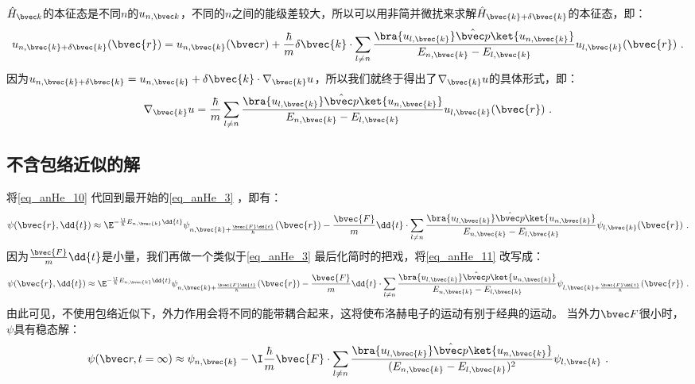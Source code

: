 $\hat H_{\bvec k}$的本征态是不同$n$的$u_{n,\bvec k}$，不同的$n$之间的能级差较大，所以可以用非简并微扰来求解$\hat H_{\bvec{k}+\delta\bvec{k}}$的本征态，即：
\begin{equation}
u_{n,\bvec{k}+\delta\bvec{k}}(\bvec{r})=u_{n,\bvec{k}}(\bvec r)+\frac{\hbar}{m}\delta\bvec{k}\cdot\sum_{l\neq n}\frac{\bra{u_{l,\bvec{k}}}\hat {\bvec p}\ket{u_{n,\bvec{k}}}}{E_{n,\bvec{k}}-E_{l,\bvec{k}}}u_{l,\bvec{k}}(\bvec{r})~.
\end{equation}
因为$u_{n,\bvec{k}+\delta\bvec{k}}=u_{n,\bvec{k}}+\delta \bvec{k}\cdot \nabla_{\bvec{k}} u$，所以我们就终于得出了$\nabla_{\bvec{k}} u$的具体形式，即：
\begin{equation}\label{eq_anHe_10}
\nabla_{\bvec{k}} u = \frac{\hbar}{m}\sum_{l\neq n}\frac{\bra{u_{l,\bvec{k}}}\hat {\bvec p}\ket{u_{n,\bvec{k}}}}{E_{n,\bvec{k}}-E_{l,\bvec{k}}}u_{l,\bvec{k}}(\bvec{r})~.
\end{equation}

\subsection{不含包络近似的解}
将\autoref{eq_anHe_10}  代回到最开始的\autoref{eq_anHe_3}   ，即有：
\begin{equation}\label{eq_anHe_11}
\psi(\bvec{r},\dd{t})\approx \E^{-\frac{\I}{\hbar}E_{n,\bvec{k}}\dd{t}}\psi_{n,\bvec{k}+\frac{\bvec{F}\dd{t}}{\hbar}}(\bvec{r})-\frac{\bvec{F}}{m}\dd{t}\cdot\sum_{l\neq n}\frac{\bra{u_{l,\bvec{k}}}\hat {\bvec p}\ket{u_{n,\bvec{k}}}}{E_{n,\bvec{k}}-E_{l,\bvec{k}}}\psi_{l,\bvec{k}}(\bvec{r})~.
\end{equation}
因为$\frac{\bvec{F}}{m}\dd{t}$是小量，我们再做一个类似于\autoref{eq_anHe_3} 最后化简时的把戏，将\autoref{eq_anHe_11} 改写成：
\begin{equation}
\psi(\bvec{r},\dd{t})\approx \E^{-\frac{\I}{\hbar}E_{n,\bvec{k}}\dd{t}}\psi_{n,\bvec{k}+\frac{\bvec{F}\dd{t}}{\hbar}}(\bvec{r})-\frac{\bvec{F}}{m}\dd{t}\cdot\sum_{l\neq n}\frac{\bra{u_{l,\bvec{k}}}\hat {\bvec p}\ket{u_{n,\bvec{k}}}}{E_{n,\bvec{k}}-E_{l,\bvec{k}}}\psi_{l,\bvec{k}+\frac{\bvec{F}\dd{t}}{\hbar}}(\bvec{r})~.
\end{equation}
由此可见，不使用包络近似下，外力作用会将不同的能带耦合起来，这将使布洛赫电子的运动有别于经典的运动。
当外力$\bvec F$很小时，$\psi$具有稳态解：
\begin{equation}
\psi(\bvec r,t=\infty)\approx\psi_{n,\bvec{k}}-\I\frac{\hbar}{m}\bvec{F}\cdot\sum_{l\neq n}\frac{\bra{u_{l,\bvec{k}}}\hat {\bvec p}\ket{u_{n,\bvec{k}}}}{(E_{n,\bvec{k}}-E_{l,\bvec{k}})^2}\psi_{l,\bvec{k}}~.
\end{equation}

